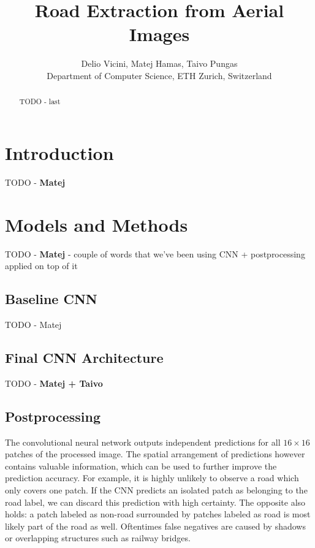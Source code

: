 \documentclass[10pt,conference,compsocconf]{IEEEtran}
\begin{document}
\title{Road Extraction from Aerial Images}
\author{
  Delio Vicini, Matej Hamas, Taivo Pungas\\
  Department of Computer Science, ETH Zurich, Switzerland
}

\maketitle

\begin{abstract}
  TODO - last
\end{abstract}

\section{Introduction}
\label{sec:intro}
TODO - \textbf{Matej}


\section{Models and Methods}
\label{sec:MM}
TODO - \textbf{Matej} - couple of words that we've been using CNN + postprocessing applied on top of it

\subsection{Baseline CNN}
\label{subsec:baselineCNN}
TODO - Matej

\subsection{Final CNN Architecture}
\label{subsec:CNN}
TODO - \textbf{Matej + Taivo}

\subsection{Postprocessing}
The convolutional neural network outputs independent predictions for all $ 16 \times 16 $ patches of the processed image. The spatial arrangement of predictions however contains valuable information, which can be used to further improve the prediction accuracy. For example, it is highly unlikely to observe a road which only covers one patch. If the CNN predicts an isolated patch as belonging to the road label, we can discard this prediction with high certainty. The opposite also holds: a patch labeled as non-road surrounded by patches labeled as road is most likely part of the road as well. Oftentimes false negatives are caused by shadows or overlapping structures such as railway bridges.
\end{document}
